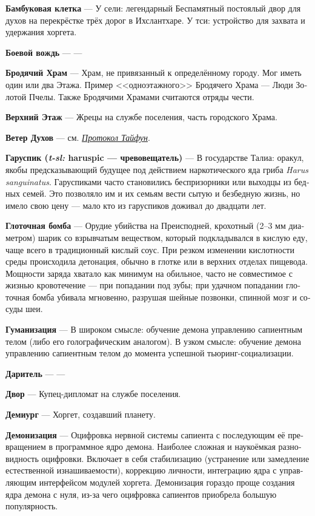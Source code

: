 \documentclass[a4paper,12pt,fleqn]{book}\usepackage{cooltooltips}\usepackage{polyglossia}\setdefaultlanguage[babelshorthands=true]{russian}\setotherlanguage{english}\defaultfontfeatures{Ligatures=TeX,Mapping=tex-text} \usepackage{xcolor}\definecolor{lightgray}{HTML}{bbbbbb}\color{lightgray}\newcommand{\ml}[3]{\textenglish{\textcolor{black}{#3}}}
\newcommand{\theterm}[3]{\textbf{\hypertarget{#1}{#2}} --- #3}
\newcommand{\thesynonim}[3]{\textbf{#2} --- см. \textit{\hyperlink{#1}{#3}}.}
\newcommand{\theorigin}[3]{\textit{#1:} #2 --- #3}
\begin{document}
{\theterm{bamboo-birdcage} %
{Бамбуковая клетка}
{У сели: легендарный Беспамятный постоялый двор для духов на перекрёстке трёх дорог в Ихслантхаре.
У тси: устройство для захвата и удержания хоргета.}

\theterm{warchief} %
{Боевой вождь}
{---}

\theterm{wandering-temple} %
{Бродячий Храм}
{Храм, не привязанный к определённому городу.
Мог иметь один или два Этажа.
Пример <<одноэтажного>> Бродячего Храма --- Люди Золотой Пчелы.
Также Бродячими Храмами считаются отряды чести.}

\theterm{upstairs} %
{Верхний Этаж}
{Жрецы на службе поселения, часть городского Храма.}

\thesynonim{protocol-taifeng}
{Ветер Духов}
{Протокол Тайфун}

\theterm{jaruspic}
{Гаруспик (\theorigin{t-sl}{haruspic}{чревовещатель})}
{В государстве Талиа: оракул, якобы предсказывающий будущее под действием наркотического яда гриба \textit{Harus sanguinatus}.
Гаруспиками часто становились беспризорники или выходцы из бедных семей.
Это позволяло им и их семьям вести сытую и безбедную жизнь, но имело свою цену --- мало кто из гаруспиков доживал до двадцати лет.}

\theterm{throat-bomb}
{Глоточная бомба}
{Орудие убийства на Преисподней, крохотный (2--3 мм диаметром) шарик со взрывчатым веществом, который подкладывался в кислую еду, чаще всего в традиционный кислый соус.
При резком изменении кислотности среды происходила детонация, обычно в глотке или в верхних отделах пищевода.
Мощности заряда хватало как минимум на обильное, часто не совместимое с жизнью кровотечение --- при попадании под зубы;
при удачном попадании глоточная бомба убивала мгновенно, разрушая шейные позвонки, спинной мозг и сосуды шеи.}

\theterm{humanization}
{Гуманизация}
{В широком смысле: обучение демона управлению сапиентным телом (либо его голографическим аналогом). В узком смысле: обучение демона управлению сапиентным телом до момента успешной тьюринг-социализации.}

\theterm{giver} %
{Даритель}
{---}

\theterm{house} %
{Двор}
{Купец-дипломат на службе поселения.}

\theterm{demiurge} %
{Демиург}
{Хоргет, создавший планету.}

\theterm{daemonization}
{Демонизация}
{Оцифровка нервной системы сапиента с последующим её превращением в программное ядро демона.
Наиболее сложная и наукоёмкая разновидность оцифровки.
Включает в себя стабилизацию (устранение или замедление естественной изнашиваемости), коррекцию личности, интеграцию ядра с управляющим интерфейсом модулей хоргета.
Демонизация гораздо проще создания ядра демона с нуля, из-за чего оцифровка сапиентов приобрела большую популярность.}

}
\end{document}

